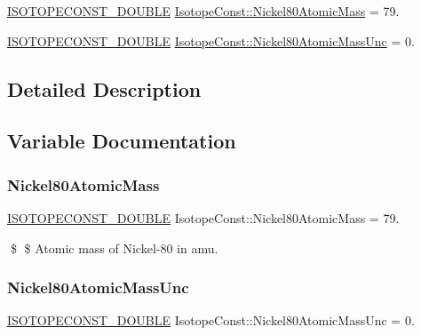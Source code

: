 \begin{DoxyCompactItemize}
\item 
\mbox{\hyperlink{group___isotope_const-_macros_ga8f45a7272ce02c0b4c65c44636ed719a}{I\+S\+O\+T\+O\+P\+E\+C\+O\+N\+S\+T\+\_\+\+D\+O\+U\+B\+LE}} \mbox{\hyperlink{group___isotope_const-_nickel-_ni80_gaa22ca9858bbf64c8c0101cdbb7040fef}{Isotope\+Const\+::\+Nickel80\+Atomic\+Mass}} = 79.
\item 
\mbox{\hyperlink{group___isotope_const-_macros_ga8f45a7272ce02c0b4c65c44636ed719a}{I\+S\+O\+T\+O\+P\+E\+C\+O\+N\+S\+T\+\_\+\+D\+O\+U\+B\+LE}} \mbox{\hyperlink{group___isotope_const-_nickel-_ni80_ga4699dfb0396e39e8e875db8f0f4168f0}{Isotope\+Const\+::\+Nickel80\+Atomic\+Mass\+Unc}} = 0.
\end{DoxyCompactItemize}


\subsection{Detailed Description}


\subsection{Variable Documentation}
\mbox{\label{group___isotope_const-_nickel-_ni80_gaa22ca9858bbf64c8c0101cdbb7040fef}} 
\subsubsection{\texorpdfstring{Nickel80\+Atomic\+Mass}{Nickel80AtomicMass}}
{\footnotesize\ttfamily \mbox{\hyperlink{group___isotope_const-_macros_ga8f45a7272ce02c0b4c65c44636ed719a}{I\+S\+O\+T\+O\+P\+E\+C\+O\+N\+S\+T\+\_\+\+D\+O\+U\+B\+LE}} Isotope\+Const\+::\+Nickel80\+Atomic\+Mass = 79.}

\$ \$ Atomic mass of Nickel-\/80 in amu. \mbox{\label{group___isotope_const-_nickel-_ni80_ga4699dfb0396e39e8e875db8f0f4168f0}} 
\subsubsection{\texorpdfstring{Nickel80\+Atomic\+Mass\+Unc}{Nickel80AtomicMassUnc}}
{\footnotesize\ttfamily \mbox{\hyperlink{group___isotope_const-_macros_ga8f45a7272ce02c0b4c65c44636ed719a}{I\+S\+O\+T\+O\+P\+E\+C\+O\+N\+S\+T\+\_\+\+D\+O\+U\+B\+LE}} Isotope\+Const\+::\+Nickel80\+Atomic\+Mass\+Unc = 0.}

